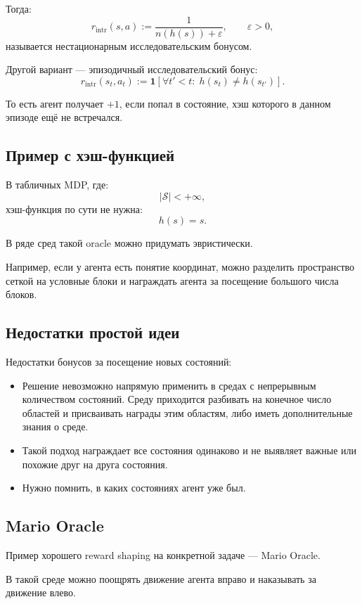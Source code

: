 \documentclass[12pt,a4paper]{article}
\begin{document}
Тогда:
\[
r_{\mathrm{intr}}(s,a)
:=
\frac{1}{n(h(s))+\varepsilon},
\qquad
\varepsilon>0,
\]
называется нестационарным исследовательским бонусом.

Другой вариант --- эпизодичный исследовательский бонус:
\[
r_{\mathrm{intr}}(s_t,a_t)
:=
\mathbf 1
\left[
\forall t'<t:\; h(s_t)\ne h(s_{t'})
\right].
\]

То есть агент получает $+1$, если попал в состояние, хэш которого в данном эпизоде ещё не встречался.

\subsection{Пример с хэш-функцией}

В табличных MDP, где:
\[
|\mathcal S|<+\infty,
\]
хэш-функция по сути не нужна:
\[
h(s)=s.
\]

В ряде сред такой oracle можно придумать эвристически.

Например, если у агента есть понятие координат, можно разделить пространство сеткой на условные блоки и награждать агента за посещение большого числа блоков.

\subsection{Недостатки простой идеи}

Недостатки бонусов за посещение новых состояний:

\begin{itemize}
    \item Решение невозможно напрямую применить в средах с непрерывным количеством состояний. Среду приходится разбивать на конечное число областей и присваивать награды этим областям, либо иметь дополнительные знания о среде.
    \item Такой подход награждает все состояния одинаково и не выявляет важные или похожие друг на друга состояния.
    \item Нужно помнить, в каких состояниях агент уже был.
\end{itemize}

\subsection{Mario Oracle}

Пример хорошего reward shaping на конкретной задаче --- Mario Oracle.

В такой среде можно поощрять движение агента вправо и наказывать за движение влево.
\end{document}
